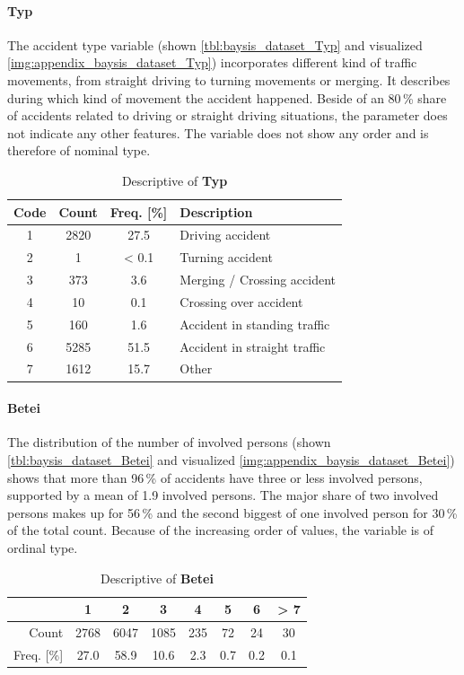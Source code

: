 \paragraph{Typ}
\label{baysis_dataset_Typ}
The accident type variable (shown \autoref{tbl:baysis_dataset_Typ} and visualized \autoref{img:appendix_baysis_dataset_Typ}) incorporates different kind of traffic movements, from straight driving to turning movements or merging. It describes during which kind of movement the accident happened. Beside of an 80\,\% share of accidents related to driving or straight driving situations, the parameter does not indicate any other features. The variable does not show any order and is therefore of nominal type.
\begin{table}[!ht]
	\centering
	\small
	\begin{tabular}{c|c|c|l} 
		\toprule
		Code & Count & Freq. [\%] & Description \\ 
		\midrule
 		1 & 2820	& 27.5	& Driving accident \\ 
 		2 & 1		& < 0.1 & Turning accident \\
 		3 & 373		& 3.6 	& Merging / Crossing accident \\
 		4 & 10		& 0.1	& Crossing over accident \\
 		5 & 160 	& 1.6	& Accident in standing traffic \\
 		6 & 5285	& 51.5	& Accident in straight traffic \\
		7 & 1612	& 15.7 	& Other \\
		\bottomrule
	\end{tabular}
	\caption{Descriptive of \textbf{Typ}}
	\label{tbl:baysis_dataset_Typ}
	\vspace{-8mm}
\end{table}

\paragraph{Betei}
\label{baysis_dataset_Betei}
The distribution of the number of involved persons (shown \autoref{tbl:baysis_dataset_Betei} and visualized \autoref{img:appendix_baysis_dataset_Betei}) shows that more than 96\,\% of accidents have three or less involved persons, supported by a mean of 1.9 involved persons. The major share of two involved persons makes up for 56\,\% and the second biggest of one involved person for 30\,\% of the total count. Because of the increasing order of values, the variable is of ordinal type.
\begin{table}[!ht]
	\centering
	\small
	\begin{tabular}{r|ccccccc} 
		\toprule
		 			& 1		& 2		& 3		& 4		& 5		& 6  	& > 7\\ 
		\midrule
 		Count 		& 2768	& 6047	& 1085	& 235	& 72 	& 24	& 30 \\ 
 		Freq. [\%] 	& 27.0	& 58.9	& 10.6 	& 2.3	& 0.7 	& 0.2 	& 0.1 \\
		\bottomrule
	\end{tabular}
	\caption{Descriptive of \textbf{Betei}}
	\label{tbl:baysis_dataset_Betei}
	\vspace{-8mm}
\end{table}

